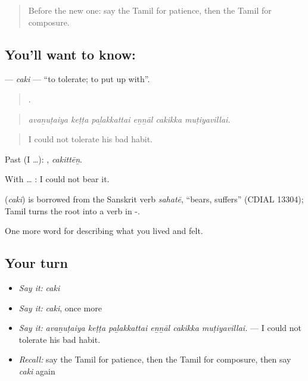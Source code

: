 \label{lesson:TA-C461-caki}



\begin{quote}
Before the new one: say the Tamil for patience, then the Tamil for composure.
\end{quote}

\subsection*{You'll want to know: }
\textbf{} — \emph{caki} — \textquotedblleft{}to tolerate; to put up with\textquotedblright{}.

\begin{quote}
     .
\end{quote}

\begin{quote}
\emph{avaṉuṭaiya keṭṭa paḻakkattai eṉṉāl cakikka muṭiyavillai.}
\end{quote}

\begin{quote}
I could not tolerate his bad habit.
\end{quote}

Past (I …): , \emph{cakittēṉ}.

With  … : I could not bear it.

\begin{cousinweb}
\textbf{} (\emph{caki}) is borrowed from the Sanskrit verb \emph{sahatē}, \textquotedblleft{}bears, suffers\textquotedblright{} (CDIAL 13304); Tamil turns the root into a verb in -.
\end{cousinweb}

\begin{grammarlens}[title={What you've built}]
One more word for describing what you lived and felt.
\end{grammarlens}

\subsection*{Your turn}
\begin{itemize}
\raggedright
  \item \emph{Say it:} \emph{caki}
  \item \emph{Say it:} \emph{caki}, once more
  \item \emph{Say it:} \emph{avaṉuṭaiya keṭṭa paḻakkattai eṉṉāl cakikka muṭiyavillai.} — I could not tolerate his bad habit.
  \item \emph{Recall:} say the Tamil for patience, then the Tamil for composure, then say \emph{caki} again
\end{itemize}

